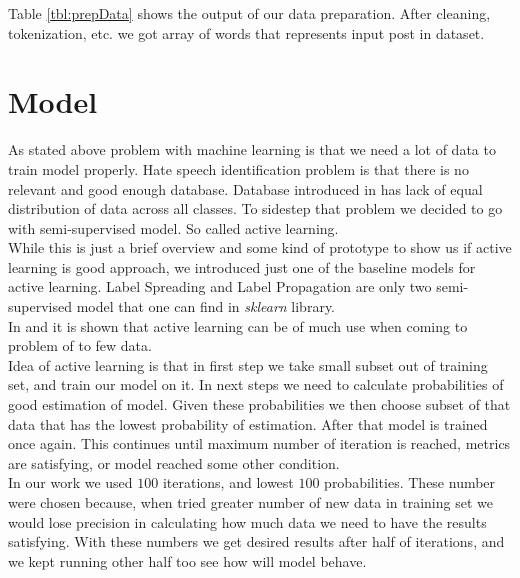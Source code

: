 \documentclass[10pt, a4paper]{article}
\begin{document}
Table \ref{tbl:prepData} shows the output of our data preparation. After cleaning, tokenization, etc. we got array of words that represents input post in dataset.

\section{Model}
As stated above problem with machine learning is that we need a lot of data to train model properly. Hate speech identification problem is that there is no relevant and good enough database. Database introduced in \cite{Davidson2017AutomatedHS} has lack of equal distribution of data across all classes. To sidestep that problem we decided to go with semi-supervised model. So called active learning.
\\While this is just a brief overview and some kind of prototype to show us if active learning is good approach, we introduced just one of the baseline models for active learning. Label Spreading and Label Propagation are only two semi-supervised model that one can find in \textit{sklearn} library.
\\In \cite{LuoALPlankton} and \cite{YangMultiClassAL} it is shown that active learning can be of much use when coming to problem of to few data.
\\Idea of active learning is that in first step we take small subset out of training set, and train our model on it. In next steps we need to calculate probabilities of good estimation of model. Given these probabilities we then choose subset of that data that has the lowest probability of estimation. After that model is trained once again. This continues until maximum number of iteration is reached, metrics are satisfying, or model reached some other condition.
\\In our work we used $100$ iterations, and lowest $100$ probabilities. These number were chosen because, when tried greater number of new data in training set we would lose precision in calculating how much data we need to have the results satisfying. With these numbers we get desired results after half of iterations, and we kept running other half too see how will model behave.
\end{document}
